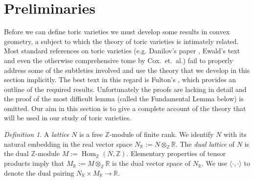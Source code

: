 \documentclass[BSc]{usydthesis}
\numberwithin{equation}{chapter}
\theoremstyle{remark}
\newtheorem{Definition}[equation]{Definition}
\newcommand{\R}{\mathbb{R}}
\newcommand{\Z}{\mathbb{Z}}
\DeclareMathOperator{\Hom}{Hom}
\begin{document}
\section{Preliminaries}
Before we can define toric varieties we must develop some results in convex geometry, a subject to which the theory of toric varieties is intimately related. Most standard references on toric varieties (e.g. Danilov's paper \cite{Danilov}, Ewald's text \cite{Ewald} and even the otherwise comprehensive tome \cite{Cox} by Cox.~et.~al.) fail to properly address some of the subtleties involved and use the theory that we develop in this section implicitly. The best text in this regard is Fulton's \cite{Fulton:Toric}, which provides an outline of the required results. Unfortunately the proofs are lacking in detail and the proof of the most difficult lemma (called the Fundamental Lemma below) is omitted. Our aim in this section is to give a complete account of the theory that will be used in our study of toric varieties. 

\begin{Definition}
A {\em lattice} $N$ is a free $\Z$-module of finite rank. We identify $N$ with its natural embedding in the real vector space $N_{\R} := N \otimes_{\Z} \R.$ The {\em dual lattice} of $N$ is the dual $\Z$-module $M:= \Hom_{\Z}(N,\Z).$ Elementary properties of tensor products imply that $M_{\R}:=M \otimes_{\Z} \R $ is the dual vector space of $N_{\R}.$ We use $\langle \cdot , \cdot \rangle$ to denote the dual pairing $N_{\R} \times M_{\R} \longrightarrow \R.$
\end{Definition}
\end{document}
